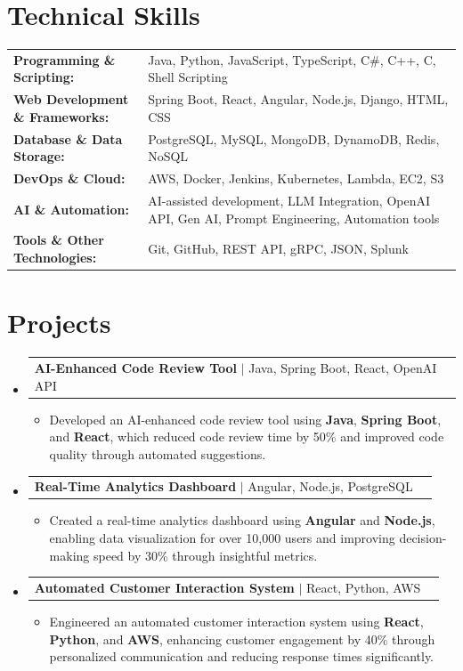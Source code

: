 \documentclass[letterpaper,10pt]{article}
\makeatletter
\newcommand{\resumeItem}[1]{
  \item{\fontsize{8pt}{9pt}\selectfont
    #1 \vspace{-3pt}
  }
}
\newcommand{\resumeProjectHeading}[2]{
    \item
    \begin{tabular*}{1.001\textwidth}{l@{\extracolsep{\fill}}r}
      \fontsize{8.5pt}{10pt}#1 & \textbf{\fontsize{8.5pt}{10pt} #2}\\
    \end{tabular*}\vspace{-7pt}
}
\newcommand{\resumeSubHeadingListStart}{\begin{itemize}[leftmargin=0pt, label={}]}
\newcommand{\resumeSubHeadingListEnd}{\end{itemize}}
\newcommand{\resumeItemListStart}{\begin{itemize}[leftmargin=*]}
\newcommand{\resumeItemListEnd}{\end{itemize}\vspace{-5pt}}
\makeatother
\begin{document}
\section{Technical Skills}
        \vspace{-14pt}
        \begin{table}[h]
            \fontsize{8pt}{9pt}\selectfont
            \begin{tabular}{p{0.3\linewidth} p{0.7\linewidth}}
                \textbf{Programming \& Scripting:} & Java, Python, JavaScript, TypeScript, C\#, C++, C, Shell Scripting \\
                \textbf{Web Development \& Frameworks:} & Spring Boot, React, Angular, Node.js, Django, HTML, CSS \\
                \textbf{Database \& Data Storage:} & PostgreSQL, MySQL, MongoDB, DynamoDB, Redis, NoSQL \\
                \textbf{DevOps \& Cloud:} & AWS, Docker, Jenkins, Kubernetes, Lambda, EC2, S3 \\
                \textbf{AI \& Automation:} & AI-assisted development, LLM Integration, OpenAI API, Gen AI, Prompt Engineering, Automation tools \\
                \textbf{Tools \& Other Technologies:} & Git, GitHub, REST API, gRPC, JSON, Splunk \\
            \end{tabular}
        \end{table}
 \vspace{-18pt}

\section{Projects}
    \vspace{-5pt}
    \resumeSubHeadingListStart
          \resumeProjectHeading
            {\textbf{AI-Enhanced Code Review Tool} $|$ Java, Spring Boot, React, OpenAI API}{}
            \resumeItemListStart
                \resumeItem{Developed an AI-enhanced code review tool using \textbf{Java}, \textbf{Spring Boot}, and \textbf{React}, which reduced code review time by 50\% and improved code quality through automated suggestions.}
            \resumeItemListEnd
        \vspace{-12pt}
    
        \resumeProjectHeading
            {\textbf{Real-Time Analytics Dashboard} $|$ Angular, Node.js, PostgreSQL}{}
        \resumeItemListStart
                \resumeItem{Created a real-time analytics dashboard using \textbf{Angular} and \textbf{Node.js}, enabling data visualization for over 10,000 users and improving decision-making speed by 30\% through insightful metrics.}
        \resumeItemListEnd
      \vspace{-12pt}
      \resumeProjectHeading
        {\textbf{Automated Customer Interaction System} $|$ React, Python, AWS}{}
    \resumeItemListStart
            \resumeItem{Engineered an automated customer interaction system using \textbf{React}, \textbf{Python}, and \textbf{AWS}, enhancing customer engagement by 40\% through personalized communication and reducing response times significantly.}
    \resumeItemListEnd
    \resumeSubHeadingListEnd
\end{document}
